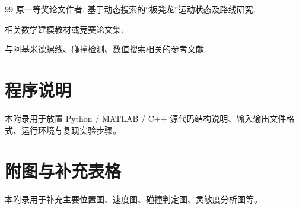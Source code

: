 \documentclass[12pt,a4paper]{ctexart}
\begin{document}
\begin{thebibliography}{99}
原一等奖论文作者. 基于动态搜索的“板凳龙”运动状态及路线研究.

相关数学建模教材或竞赛论文集.

与阿基米德螺线、碰撞检测、数值搜索相关的参考文献.
\end{thebibliography}

\appendix

\section{程序说明}
本附录用于放置 Python / MATLAB / C++ 源代码结构说明、输入输出文件格式、运行环境与复现实验步骤。

\section{附图与补充表格}
本附录用于补充主要位置图、速度图、碰撞判定图、灵敏度分析图等。
\end{document}
